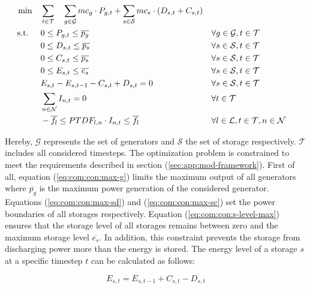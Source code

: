 \begin{subequations}
	\begin{align}
		 \min \quad & \sum_{t\in\mathcal{T}} \quad \sum_{g\in\mathcal{G}}mc_g \cdot P_{g,t} + \sum_{s\in\mathcal{S}}mc_s \cdot (D_{s,t}+C_{s,t})\\
		 \text{s.t. } \quad & 0 \leq P_{g,t} \leq \overline{p_g} && \forall g \in \mathcal{G}, t \in \mathcal{T} \label{eq:com:con:max-g}\\
		 & 0 \leq D_{s,t} \leq \overline{p_s} && \forall s \in \mathcal{S}, t \in \mathcal{T} \label{eq:com:con:max-sd}\\
		 & 0 \leq C_{s,t} \leq \overline{p_s} && \forall s \in \mathcal{S}, t \in \mathcal{T} \label{eq:com:con:max-sc}\\
		 & 0 \leq E_{s,t} \leq \overline{e_s} && \forall s \in \mathcal{S}, t \in \mathcal{T} \label{eq:com:con:s-level-max}\\
		 & E_{s,t} - E_{s,t-1} - C_{s,t} + D_{s,t} = 0 && \forall s \in \mathcal{S}, t \in \mathcal{T} \label{eq:com:con:s-level}\\
		 & \sum_{n \in \mathcal{N}} I_{n,t} = 0 && \forall t \in \mathcal{T} \label{eq:com:con:eb}\\
		 & -\overline{f_l} \leq PTDF_{l,n} \cdot I_{n,t} \leq \overline{f_l} && \forall l \in \mathcal{L}, t \in \mathcal{T}, n \in \mathcal{N} \label{eq:com:con:pf}
	\end{align}
\end{subequations}

Hereby, $\mathcal{G}$ represents the set of generators and $\mathcal{S}$ the set of storage respectively. $\mathcal{T}$ includes all considered timesteps. The optimization problem is constrained to meet the requirements described in section (\ref{sec:app:mod-framework}). First of all, equation (\ref{eq:com:con:max-g}) limits the maximum output of all generators where $\overline{p_g}$ is the maximum power generation of the considered generator. Equations (\ref{eq:com:con:max-sd}) and (\ref{eq:com:con:max-sc}) set the power boundaries of all storages respectively. Equation (\ref{eq:com:con:s-level-max}) ensures that the storage level of all storages remains between zero and the maximum storage level $\overline{e_s}$. In addition, this constraint prevents the storage from discharging power more than the energy is stored. The energy level of a storage $s$ at a specific timestep $t$ can be calculated as follows:

\begin{equation}
	\label{eq:storage-level}
	E_{s,t} = E_{s,t-1} + C_{s,t} - D_{s,t}
\end{equation}

